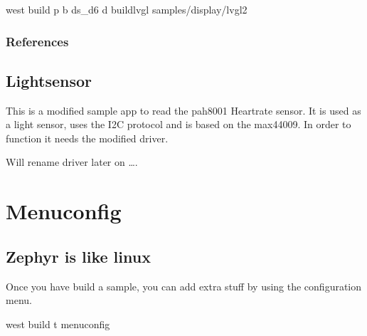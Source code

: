 \documentclass[letterpaper,10pt,english]{sphinxmanual}
\begin{document}
west build \sphinxhyphen{}p \sphinxhyphen{}b ds\_d6 \sphinxhyphen{}d build\sphinxhyphen{}lvgl samples/display/lvgl2


\subsection{References}
\label{\detokenize{samples/lvgl2/README:references}}

\section{Lightsensor}
\label{\detokenize{samples/max44009/README:lightsensor}}\label{\detokenize{samples/max44009/README::doc}}
This is a modified sample app to read the pah8001 Heartrate sensor.
It is used as a light sensor, uses the I2C protocol and is based on the max44009.
In order to function it needs the modified driver.

Will rename driver later on ….


\chapter{Menuconfig}
\label{\detokenize{menuconfig:menuconfig}}\label{\detokenize{menuconfig::doc}}

\section{Zephyr is like linux}
\label{\detokenize{menuconfig:zephyr-is-like-linux}}
Once you have build a sample, you can add extra stuff by using the configuration menu.

\begin{sphinxVerbatim}[commandchars=\\\{\}]
 west build \PYGZhy{}t menuconfig
\end{sphinxVerbatim}
\end{document}
